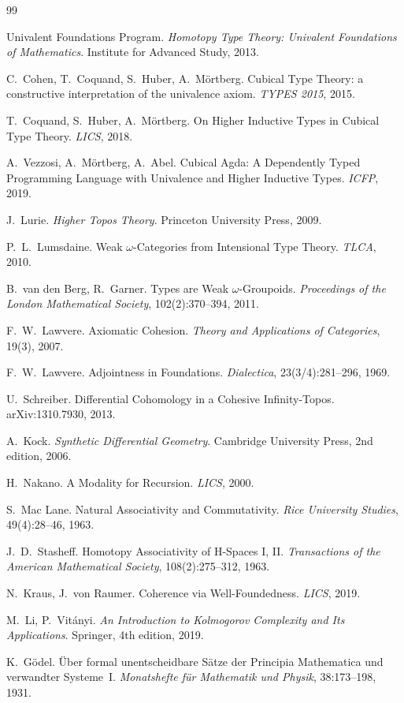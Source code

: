 \documentclass[11pt,a4paper]{article}
\theoremstyle{plain}
\theoremstyle{definition}
\theoremstyle{remark}
\begin{document}
\begin{thebibliography}{99}

Univalent Foundations Program.
\textit{Homotopy Type Theory: Univalent Foundations of Mathematics}.
Institute for Advanced Study, 2013.

C.~Cohen, T.~Coquand, S.~Huber, A.~M\"ortberg.
Cubical Type Theory: a constructive interpretation of the univalence axiom.
\textit{TYPES 2015}, 2015.

T.~Coquand, S.~Huber, A.~M\"ortberg.
On Higher Inductive Types in Cubical Type Theory.
\textit{LICS}, 2018.

A.~Vezzosi, A.~M\"ortberg, A.~Abel.
Cubical Agda: A Dependently Typed Programming Language with Univalence and Higher Inductive Types.
\textit{ICFP}, 2019.

J.~Lurie.
\textit{Higher Topos Theory}.
Princeton University Press, 2009.

P.~L.~Lumsdaine.
Weak $\omega$-Categories from Intensional Type Theory.
\textit{TLCA}, 2010.

B.~van den Berg, R.~Garner.
Types are Weak $\omega$-Groupoids.
\textit{Proceedings of the London Mathematical Society}, 102(2):370--394, 2011.

F.~W.~Lawvere.
Axiomatic Cohesion.
\textit{Theory and Applications of Categories}, 19(3), 2007.

F.~W.~Lawvere.
Adjointness in Foundations.
\textit{Dialectica}, 23(3/4):281--296, 1969.

U.~Schreiber.
Differential Cohomology in a Cohesive Infinity-Topos.
arXiv:1310.7930, 2013.

A.~Kock.
\textit{Synthetic Differential Geometry}.
Cambridge University Press, 2nd edition, 2006.

H.~Nakano.
A Modality for Recursion.
\textit{LICS}, 2000.

S.~Mac Lane.
Natural Associativity and Commutativity.
\textit{Rice University Studies}, 49(4):28--46, 1963.

J.~D.~Stasheff.
Homotopy Associativity of H-Spaces I, II.
\textit{Transactions of the American Mathematical Society}, 108(2):275--312, 1963.

N.~Kraus, J.~von Raumer.
Coherence via Well-Foundedness.
\textit{LICS}, 2019.

M.~Li, P.~Vit\'anyi.
\textit{An Introduction to Kolmogorov Complexity and Its Applications}.
Springer, 4th edition, 2019.

K.~G\"odel.
\"Uber formal unentscheidbare S\"atze der Principia Mathematica und verwandter Systeme~I.
\textit{Monatshefte f\"ur Mathematik und Physik}, 38:173--198, 1931.

\end{thebibliography}
\end{document}
